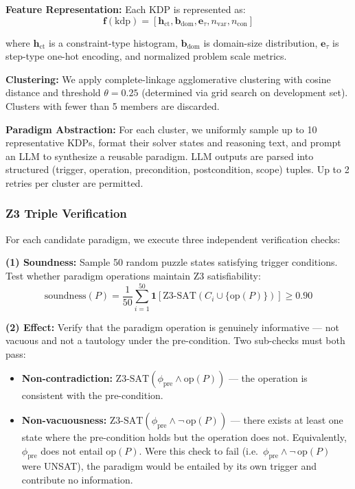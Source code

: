 \textbf{Feature Representation:} Each KDP is represented as:
$$\mathbf{f}(\text{kdp}) = [\mathbf{h}_{\text{ct}}, \mathbf{b}_{\text{dom}}, \mathbf{e}_\tau, n_{\text{var}}, n_{\text{con}}]$$

where $\mathbf{h}_{\text{ct}}$ is a constraint-type histogram, $\mathbf{b}_{\text{dom}}$ is domain-size distribution, $\mathbf{e}_\tau$ is step-type one-hot encoding, and normalized problem scale metrics.

\textbf{Clustering:} We apply complete-linkage agglomerative clustering with cosine distance and threshold $\theta = 0.25$ (determined via grid search on development set). Clusters with fewer than 5 members are discarded.

\textbf{Paradigm Abstraction:} For each cluster, we uniformly sample up to 10 representative KDPs, format their solver states and reasoning text, and prompt an LLM to synthesize a reusable paradigm. LLM outputs are parsed into structured (trigger, operation, precondition, postcondition, scope) tuples. Up to 2 retries per cluster are permitted.

\subsubsection{Z3 Triple Verification}

For each candidate paradigm, we execute three independent verification checks:

\textbf{(1) Soundness:} Sample 50 random puzzle states satisfying trigger conditions. Test whether paradigm operations maintain Z3 satisfiability:
$$\text{soundness}(P) = \frac{1}{50} \sum_{i=1}^{50} \mathbf{1}[\text{Z3-SAT}(C_i \cup \{\text{op}(P)\})] \geq 0.90$$

\textbf{(2) Effect:} Verify that the paradigm operation is genuinely informative — not vacuous and not a tautology under the pre-condition.  Two sub-checks must both pass:
\begin{itemize}
    \item \textbf{Non-contradiction:} $\text{Z3-SAT}(\phi_{\text{pre}} \wedge \text{op}(P))$ — the operation is consistent with the pre-condition.
    \item \textbf{Non-vacuousness:} $\text{Z3-SAT}(\phi_{\text{pre}} \wedge \neg\,\text{op}(P))$ — there exists at least one state where the pre-condition holds but the operation does not. Equivalently, $\phi_{\text{pre}}$ does not entail $\text{op}(P)$. Were this check to fail (i.e.\ $\phi_{\text{pre}} \wedge \neg\,\text{op}(P)$ were UNSAT), the paradigm would be entailed by its own trigger and contribute no information.
\end{itemize}

